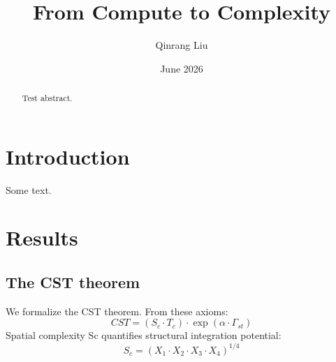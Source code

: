 \documentclass[a4paper,12pt]{article}
\title{From Compute to Complexity}
\author{Qinrang Liu}
\date{June 2026}
\begin{document}
\maketitle
\begin{abstract}
Test abstract.
\end{abstract}
\section{Introduction}
Some text.
\section{Results}
\subsection{The CST theorem}
We formalize the CST theorem.
From these axioms:
\begin{equation}
CST = (S_c \cdot T_c) \cdot \exp(\alpha \cdot \Gamma_{st}) \tag{1}
\end{equation}
Spatial complexity Sc quantifies structural integration potential:
\begin{equation}
S_c = (X_1 \cdot X_2 \cdot X_3 \cdot X_4)^{1/4} \tag{2}
\end{equation}
\end{document}
